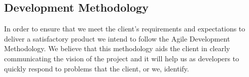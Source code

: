 \subsection{Development Methodology}
In order to ensure that we meet the client's requirements and expectations to deliver a satisfactory product we intend to follow the Agile Development Methodology. We believe that this methodology aids the client in clearly  communicating the vision of the project and it will help us as developers to quickly respond to problems that the client, or we, identify. 